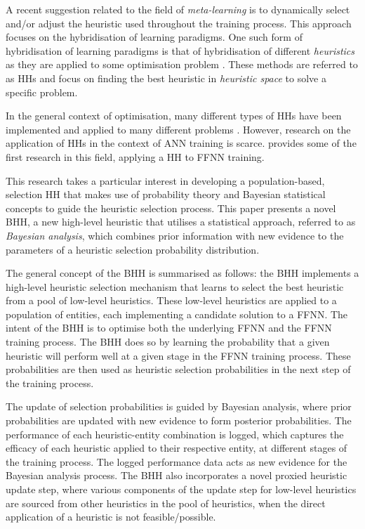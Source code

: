 \documentclass[preprint,review,12pt]{elsarticle}
\begin{document}
A recent suggestion related to the field of \textit{meta-learning} is to dynamically select and/or adjust the heuristic used throughout the training process. This approach focuses on the hybridisation of learning paradigms. One such form of hybridisation of learning paradigms is that of hybridisation of different \textit{heuristics} as they are applied to some optimisation problem \citep{ref:burke:2013}. These methods are referred to as \acfp{HH} and focus on finding the best heuristic in \textit{heuristic space} to solve a specific problem.

In the general context of optimisation, many different types of \acp{HH} have been implemented and applied to many different problems \citep{ref:burke:2013}. However, research on the application of \acp{HH} in the context of \acs{ANN} training is scarce. \citet{ref:nel:2021} provides some of the first research in this field, applying a \acs{HH} to \acf{FFNN} training.

This research takes a particular interest in developing a population-based, selection \acs{HH} that makes use of probability theory and Bayesian statistical concepts to guide the heuristic selection process. This paper presents a novel \acf{BHH}, a new high-level heuristic that utilises a statistical approach, referred to as \textit{Bayesian analysis}, which combines prior information with new evidence to the parameters of a heuristic selection probability distribution.

The general concept of the \acs{BHH} is summarised as follows: the \acs{BHH} implements a high-level heuristic selection mechanism that learns to select the best heuristic from a pool of low-level heuristics. These low-level heuristics are applied to a population of entities, each implementing a candidate solution to a \acs{FFNN}. The intent of the \acs{BHH} is to optimise both the underlying \acs{FFNN} and the \acs{FFNN} training process. The \acs{BHH} does so by learning the probability that a given heuristic will perform well at a given stage in the \acs{FFNN} training process. These probabilities are then used as heuristic selection probabilities in the next step of the training process.

The update of selection probabilities is guided by Bayesian analysis, where prior probabilities are updated with new evidence to form posterior probabilities. The performance of each heuristic-entity combination is logged, which captures the efficacy of each heuristic applied to their respective entity, at different stages of the training process. The logged performance data acts as new evidence for the Bayesian analysis process. The \acs{BHH} also incorporates a novel proxied heuristic update step, where various components of the update step for low-level heuristics are sourced from other heuristics in the pool of heuristics, when the direct application of a heuristic is not feasible/possible.
\end{document}
